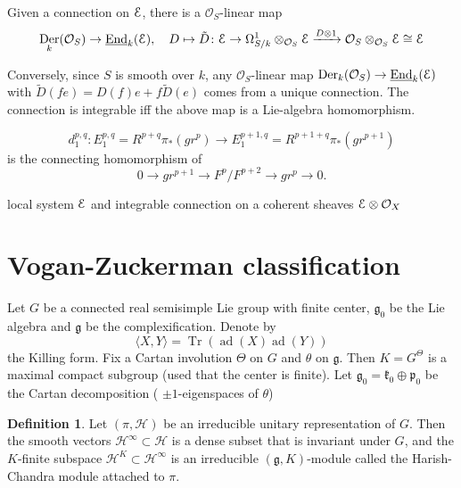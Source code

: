 \documentclass[leqno]{amsart}
\newcommand{\EE}{\EuScript{E}}
\DeclareMathOperator{\adj}{ad}
\DeclareMathOperator{\Tr}{Tr}
\newcommand{\oo}{\mathcal O}
\newcommand{\1}{\mathbf{1}}
\DeclareMathOperator{\Der}{Der}
\newcommand{\rfg}{\mathfrak{g}_0}
\newcommand{\cfg}{\mathfrak{g}}
\newcommand{\rfk}{\mathfrak{k}_0}
\newcommand{\rfp}{\mathfrak{p}_0}
\DeclareMathOperator{\End}{End}
\theoremstyle{definition}
\newtheorem{defn}[thm]{Definition}
\theoremstyle{remark}
\begin{document}
Given a connection on $\EE$,
there is a  $\oo_S$-linear map
 \[
	 \Der_k(\oo_S)\to \underline{\End}_k(\EE),\quad
	 D\mapsto
	 \tilde{D}\colon 
	 \EE\to \Omega_{S/k}^1\otimes_{\oo_S}\EE
	 \xrightarrow{D\otimes 1}
	 \oo_S\otimes_{\oo_S}\EE\cong \EE
\]

Conversely, since $S$ is smooth over  $k$,
any  $\oo_S$-linear map
$\Der_k(\oo_S)\to \underline{\End}_k(\EE)$
with  $ \tilde{D}(fe)=D(f)e+f\tilde{D}(e)$
comes from a unique connection.
The connection is integrable iff
the above map is a Lie-algebra homomorphism.

 \[
	 d_1^{p,q}\colon E_1^{p,q}=R^{p+q}\pi_*(gr^p)\to 
	 E_1^{p+1,q}=R^{p+1+q}\pi_*(gr^{p+1})
\]
is the connecting homomorphism of 
\[
	0\to gr^{p+1}\to F^p/F^{p+2}\to gr^p\to 0.
\]

local system $\EE$ and 
integrable connection on a coherent sheaves $\EE\otimes\oo_X$

\section{Vogan-Zuckerman classification}

Let $G$ be a connected real semisimple Lie group
with finite center,
$\rfg$ be the Lie algebra
and  $\cfg$ be the complexification.
Denote by
\[
	\langle X,Y\rangle=\Tr(\adj(X)\adj(Y))
\]
the Killing form.
Fix a Cartan involution $\Theta$ on  $G$
and  $\theta$ on  $\cfg$.
Then $K=G^\Theta$ is a maximal compact subgroup
(used that the center is finite).
Let  $\rfg=\rfk\oplus \rfp$
be the Cartan decomposition
( $\pm1$-eigenspaces of  $\theta$)

 \begin{defn}
	 Let $(\pi,\mathcal{H})$
	 be an irreducible unitary 
	 representation of $G$.
	 Then the smooth vectors
	 $\mathcal{H}^\infty\subset \mathcal{H}$
	  is a dense subset that is 
	  invariant under $G$,
	  and the  $K$-finite subspace
	  $\mathcal{H}^K\subset\mathcal{H}^\infty$
	  is an irreducible  $(\cfg, K)$-module
	  called the Harish-Chandra module
	  attached to  $\pi$.
\end{defn}
\end{document}
